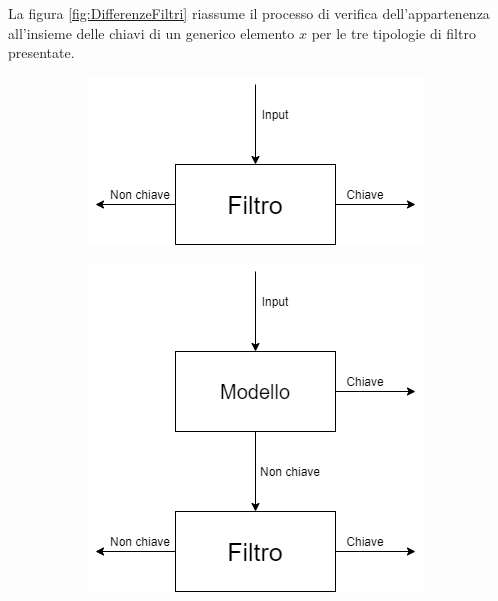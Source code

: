 \documentclass[../../main.tex]{subfiles}
\begin{document}
    La figura \ref{fig:DifferenzeFiltri} riassume il processo di verifica dell'appartenenza all'insieme delle chiavi di un generico elemento $x$ per le tre tipologie di filtro presentate.
    
    \begin{figure}[H]
        \centering
        \begin{subfigure}[c]{0.3\textwidth}
            \includegraphics[width=\textwidth]{immagini/5_2/bloomFilter.png}
            \caption{}
            \label{fig:appartenenzaBF}
        \end{subfigure}
        \begin{subfigure}[c]{0.3\textwidth}
            \includegraphics[width=\textwidth]{immagini/5_2/LBF.png}
            \caption{}

\end{subfigure}
\end{figure}
\end{document}

